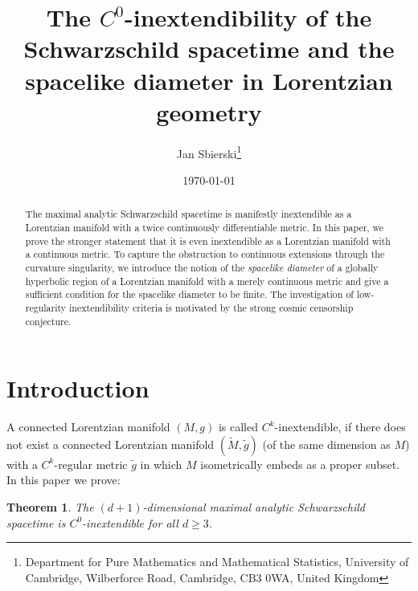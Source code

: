 \documentclass[reqno]{article}
\begin{document}
\newtheorem{theorem}[equation]{Theorem}
\newtheorem{remark}[equation]{Remark}
\newtheorem{claim}[equation]{Claim}
\newtheorem{lemma}[equation]{Lemma}
\newtheorem{definition}[equation]{Definition}
\newtheorem{premiss}[equation]{Premiss}
\newtheorem{corollary}[equation]{Corollary}
\newtheorem{proposition}[equation]{Proposition}
\newtheorem*{theorem*}{Theorem}





\title{The $C^0$-inextendibility of the Schwarzschild spacetime and the spacelike diameter in Lorentzian geometry}
\author{Jan Sbierski\thanks{Department for Pure Mathematics and Mathematical Statistics, University of Cambridge,
Wilberforce Road,
Cambridge,
CB3 0WA,
United Kingdom}}
\date{\today}








\maketitle

\begin{abstract}
The maximal analytic Schwarzschild spacetime is manifestly inextendible as a Lorentzian manifold with a twice continuously differentiable metric. 
In this paper, we prove the stronger statement that it is even inextendible as a Lorentzian manifold with a continuous metric. To capture the obstruction to continuous extensions through the curvature singularity, we introduce the notion of the \emph{spacelike diameter} of a globally hyperbolic region of a Lorentzian manifold with a merely continuous metric and give a sufficient condition for the spacelike diameter to be finite. 
The investigation of low-regularity inextendibility criteria is motivated by the strong cosmic censorship conjecture.
\end{abstract}

\tableofcontents

\restoregeometry
\section{Introduction}


A connected Lorentzian manifold $(M,g)$ is called $C^k$-inextendible, if there does not exist a connected Lorentzian manifold $(\tilde{M}, \tilde{g})$ (of the same dimension as $M$) with a $C^k$-regular metric $\tilde{g}$ in which $M$ isometrically embeds as a proper subset.
In this paper we prove:
\begin{theorem*}\label{schwthm:dimensional_maximal_analytic_schwarzschild}
The $(d+1)$-dimensional maximal analytic Schwarzschild spacetime is $C^0$-inextendible for all $d \geq 3$.
\end{theorem*} 
\end{document}

